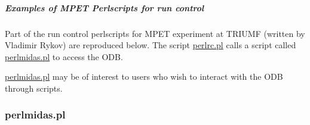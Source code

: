 \subparagraph{Examples of MPET Perlscripts for run control}\label{RC_mhttpd_perlrc}
\par


 \label{RC_mhttpd_perlrc_idx_script_perlmidas}
\hypertarget{RC_mhttpd_perlrc_idx_script_perlmidas}{}


Part of the run control perlscripts for MPET experiment at TRIUMF (written by Vladimir Rykov) are reproduced below. The script \hyperlink{RC_mhttpd_perlrc_RC_mhttpd_perlrc_script}{perlrc.pl} calls a script called \hyperlink{RC_mhttpd_perlrc_RC_mhttpd_perlmidas_script}{perlmidas.pl} to access the ODB.

\hyperlink{RC_mhttpd_perlrc_RC_mhttpd_perlmidas_script}{perlmidas.pl} may be of interest to users who wish to interact with the ODB through scripts.\hypertarget{RC_mhttpd_perlrc_RC_mhttpd_perlmidas_script}{}\subsubsection{perlmidas.pl}\label{RC_mhttpd_perlrc_RC_mhttpd_perlmidas_script}

